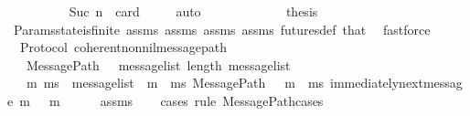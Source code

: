 \begin{isabellebody}
\ \ \ \ \ \ \ \ \isamarkupfalse%
\ {\isacartoucheopen}Suc\ n\ {\isacharequal}\ card\ {\isacharparenleft}{\isasymsigma}{\isacharprime}\ {\isacharminus}\ {\isasymsigma}{\isacharparenright}{\isacartoucheclose}\ \isamarkupfalse%
\ auto\isanewline
\ \ \ \ \isamarkupfalse%
\isanewline
\ \ \isacommand{{\isacharbraceright}}\isamarkupfalse%
\isanewline
\isanewline
\ \ \isamarkupfalse%
\ \isamarkupfalse%
\ {\isacharquery}thesis\isanewline
\ \ \ \ \isamarkupfalse%
\ Params{\isachardot}state{\isacharunderscore}is{\isacharunderscore}finite\ assms{\isacharparenleft}{}{\isacharparenright}\ assms{\isacharparenleft}{}{\isacharparenright}\ assms{\isacharparenleft}{}{\isacharparenright}\ assms{\isacharparenleft}{}{\isacharparenright}\ futures{\isacharunderscore}def\ that\ \isamarkupfalse%
\ fastforce\isanewline
{}\isamarkupfalse%
%
\endisatagproof
{\isafoldproof}%
%
\isadelimproof
\isanewline
%
\endisadelimproof
\isanewline
{}\isamarkupfalse%
\ {\isacharparenleft}\ Protocol{\isacharparenright}\ coherent{\isacharunderscore}nonnil{\isacharunderscore}message{\isacharunderscore}path{\isacharcolon}\isanewline
\ \ \ {\isachardoublequoteopen}MessagePath\ {\isasymsigma}\ {\isasymsigma}{\isacharprime}\ message{\isacharunderscore}list{\isachardoublequoteclose}\ {\isachardoublequoteopen}length\ message{\isacharunderscore}list\ {\isasymnoteq}\ {}{\isachardoublequoteclose}\isanewline
\ \ \ m\ ms\ \ {\isachardoublequoteopen}message{\isacharunderscore}list\ {\isacharequal}\ m\ {\isacharhash}\ ms{\isachardoublequoteclose}\ {\isachardoublequoteopen}MessagePath\ {\isacharparenleft}{\isasymsigma}\ {\isasymunion}\ {\isacharbraceleft}m{\isacharbraceright}{\isacharparenright}\ {\isasymsigma}{\isacharprime}\ ms{\isachardoublequoteclose}\ {\isachardoublequoteopen}immediately{\isacharunderscore}next{\isacharunderscore}message\ {\isacharparenleft}{\isasymsigma}{\isacharcomma}m{\isacharparenright}{\isachardoublequoteclose}\ {\isachardoublequoteopen}{\isasymsigma}\ {\isasymunion}\ {\isacharbraceleft}m{\isacharbraceright}\ {\isasymin}\ {\isasymSigma}{\isachardoublequoteclose}\isanewline
%
\isadelimproof
\ \ %
\endisadelimproof
%
\isatagproof
{}\isamarkupfalse%
\ assms\isanewline
\ \ \isamarkupfalse%
\ {\isacharparenleft}cases\ rule{\isacharcolon}\ MessagePath{\isachardot}cases{\isacharparenright}\isanewline

\end{isabellebody}
